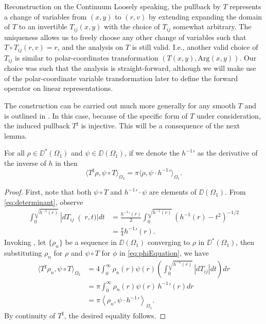 \begin{chapter}{Reconstruction on the Continuum}
Loosely speaking, the pullback by $T$ represents a change of variables from $(x,y)$ to $(r,v)$ by extending expanding the domain of $T$ to an invertible $T_{ij}(x,y)$ with the choice of $T_{ij}$ somewhat arbitrary.  
The uniqueness allows us to freely choose any other change of variables such that $T \circ T_{ij}(r,v) = r$, and the analysis on $T$ is still valid.
I.e., another valid choice of $T_{ij}$ is similar to polar-coordinates transformation $(T(x,y), \mathrm{Arg}(x,y))$.
Our choice was such that the analysis is straight-forward, although we will make use of the polar-coordinate variable transformation later to define the forward operator on linear representations.

The construction can be carried out much more generally for any smooth $T$ and is outlined in \cite{hormander1983}.
In this case, because of the specific form of $T$ under consideration, the induced pullback $T^\sharp$ is injective. 
This will be a consequence of the next lemma.
\begin{lem} \label{lem:innerProduct}
  For all $\rho\in\DD^*(\Omega_1)$ and $\psi \in \DD(\Omega_1)$, if we denote the ${h^{-1}}'$ as the derivative of the inverse of $h$ in  
  then
  \begin{equation}
    \langle T^\sharp \rho , \psi \circ T \rangle_{\Omega_2} = \pi \langle \rho,\psi \cdot {h^{-1}}'\rangle_{\Omega_1}.
  \end{equation}
\end{lem}
\begin{proof}
  First, note that both $\psi \circ T$ and ${h^{-1}}'\cdot \psi$ are elements of $\DD(\Omega_1)$.  
  From \eqref{eq:determinant}, observe
  \begin{align}
    \int_0^{\sqrt{h^{-1}(r)}} \left|dT_{ij}\right(r,t)| dt 
    &= \frac{{h^{-1}}'(r)}2 \int_0^{\sqrt{h^{-1}(r)}}\left(h^{-1}(r) - t^2\right)^{-1/2}\nonumber\\
    &= \frac\pi4 {h^{-1}}'(r).
  \end{align}
  Invoking , let $\{\rho_n\}$ be a sequence in $\DD(\Omega_1)$ converging to $\rho$ in $\DD^*(\Omega_1)$, then substituting $\rho_n$ for $\rho$ and $\psi \circ T$ for $\phi$ in \eqref{eq:phiEquation}, we have
  \begin{align}
    \langle T^\sharp \rho_n, \psi \circ T \rangle_{\Omega_2}  &= 4\int_0^\infty \rho_n(r) \psi(r)  \left(\int_0^{\sqrt{h^{-1}(r)}} \left|dT_{ij}\right| dt\right) dr \nonumber \\
      &= \pi \int_0^\infty \rho_n(r) \psi(r)\,{h^{-1}}'(r) dr \nonumber\\
      &= \pi \left\langle\rho_n, \psi  \cdot {h^{-1}}' \right\rangle_{\Omega_1}. \label{pullbackinnerprod}
  \end{align}
  By continuity of $T^\sharp$, the desired equality follows.
\end{proof}


\end{chapter}
